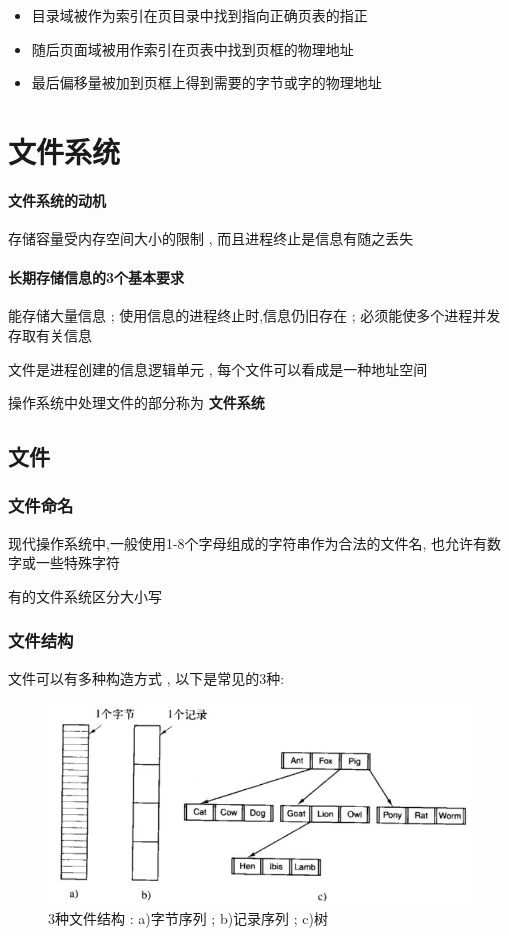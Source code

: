 \documentclass[UTF8,a4paper]{ctexart}
\begin{document}
\begin{itemize}
	\item 目录域被作为索引在页目录中找到指向正确页表的指正
	\item 随后页面域被用作索引在页表中找到页框的物理地址
	\item 最后偏移量被加到页框上得到需要的字节或字的物理地址
\end{itemize}
 
\section{文件系统}

\paragraph{文件系统的动机}
存储容量受内存空间大小的限制 , 而且进程终止是信息有随之丢失

\paragraph{长期存储信息的3个基本要求} 能存储大量信息 ; 使用信息的进程终止时,信息仍旧存在 ; 必须能使多个进程并发存取有关信息

文件是进程创建的信息逻辑单元 , 每个文件可以看成是一种地址空间

操作系统中处理文件的部分称为 \textbf{文件系统}

\subsection{文件}
\subsubsection{文件命名} 
现代操作系统中,一般使用1-8个字母组成的字符串作为合法的文件名, 也允许有数字或一些特殊字符

有的文件系统区分大小写

\subsubsection{文件结构} 
文件可以有多种构造方式 , 以下是常见的3种:
\begin{figure}[H]
	\centering
	\includegraphics[scale = 0.5]{assets/ModernOperatingSystems/2018-01-10-23-55-30.png}
	\caption{3种文件结构 : a)字节序列 ; b)记录序列 ; c)树}
\end{figure}
\end{document}
